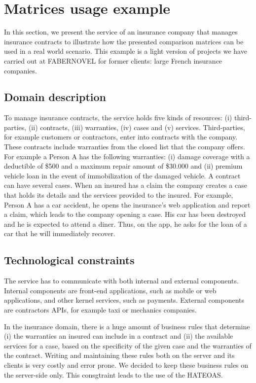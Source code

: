 \section{Matrices usage example}

\vspace*{-0.2cm}


In this section, we present the service of an insurance company that manages insurance contracts to illustrate how the presented comparison matrices can be used in a real world scenario. This example is a light version of projects we have carried out at FABERNOVEL for former clients: large French insurance companies.

\subsection{Domain description}

To manage insurance contracts, the service holds five kinds of resources: (i) third-parties, (ii) contracts, (iii) warranties, (iv) cases and (v) services. Third-parties, for example customers or contractors, enter into contracts with the company. These contracts include warranties from the closed list that the company offers. For example a Person A has the following warranties: (i) damage coverage with a deductible of \$500 and a maximum repair amount of \$30.000 and (ii) premium vehicle loan in the event of immobilization of the damaged vehicle. A contract can have several cases. When an insured has a claim the company creates a case that holds its details and the services provided to the insured. For example, Person A has a car accident, he opens the insurance's web application and report a claim, which leads to the company opening a case. His car has been destroyed and he is expected to attend a diner. Thus, on the app, he asks for the loan of a car that he will immediately recover.

\subsection{Technological constraints}

The service has to communicate with both internal and external components. Internal components are front-end applications, such as mobile or web applications, and other kernel services, such as payments. External components are contractors APIs, for example taxi or mechanics companies.

In the insurance domain, there is a huge amount of business rules that determine (i) the warranties an insured can include in a contract and (ii) the available services for a case, based on the specificity of the given case and the warranties of the contract. Writing and maintaining these rules both on the server and its clients is very costly and error prone. We decided to keep these business rules on the server-side only. This consgtraint leads to the use of the HATEOAS.

